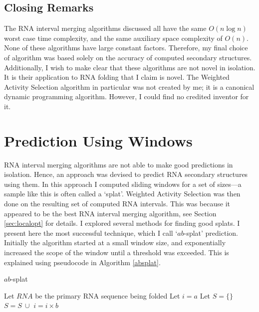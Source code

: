 \documentclass{cshonours}
\begin{document}
\subsection{Closing Remarks}

The RNA interval merging algorithms discussed all have the same $O(n \log n)$ worst case time complexity, and the same auxiliary space complexity of $O(n)$. None of these algorithms have large constant factors. Therefore, my final choice of algorithm was based solely on the accuracy of computed secondary structures. Additionally, I wish to make clear that these algorithms are not novel in isolation. It is their application to RNA folding that I claim is novel. The Weighted Activity Selection algorithm in particular was not created by me; it is a canonical dynamic programming algorithm. However, I could find no credited inventor for it.





\section{Prediction Using Windows}
\label{sec:absplat}
RNA interval merging algorithms are not able to make good predictions in isolation. Hence, an approach was devised to predict RNA secondary structures using them. In this approach I computed sliding windows for a set of sizes---a sample like this is often called a `splat'. Weighted Activity Selection was then done on the resulting set of computed RNA intervals.  This was because it appeared to be the best RNA interval merging algorithm, see Section \ref{sec:localopt} for details. I explored several methods for finding good splats. I present here the most successful technique, which I call `$ab$-splat' prediction. Initially the algorithm started at a small window size, and exponentially increased the scope of the window until a threshold was exceeded. This is explained using pseudocode in Algorithm \ref{absplat}.

\begin{algorithm}
  \caption{$ab$-splat}
  \label{absplat}
  \begin{algorithmic}[1]
  \State Let $RNA$ be the primary RNA sequence being folded
  \State Let $i = a$
  \State Let $S = \{\}$
  	\State $S = S \: \cup $ 
  	\State $i = i \times b$
  \EndWhile
  \State \Return {}
  \end{algorithmic}
\end{algorithm}
\end{document}
